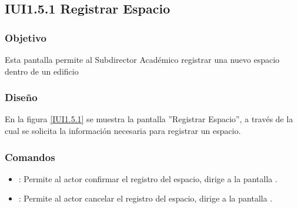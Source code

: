 \subsection{IUI1.5.1 Registrar Espacio}

\subsubsection{Objetivo}
	Esta pantalla permite al Subdirector Académico registrar una nuevo espacio dentro de un edificio

\subsubsection{Diseño}

    En la figura \ref{IUI1.5.1} se muestra la pantalla ''Registrar Espacio'', a través de la cual se solicita la información necesaria para registrar un espacio.
 

\subsubsection{Comandos}
    \begin{itemize}
	\item {}: Permite al actor confirmar el registro del espacio, dirige a la pantalla .
	
	\item {}: Permite al actor cancelar el registro del espacio, dirige a la pantalla .
    \end{itemize}
